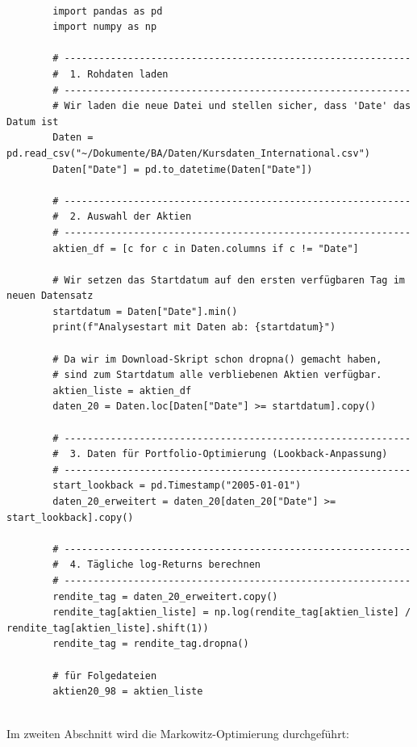 \documentclass[parskip=half]{scrartcl}
\begin{document}
	\begin{lstlisting}[caption={Daten-Vorbereitung}, label={lst:daten_code}]
		
		import pandas as pd
		import numpy as np
		
		# ------------------------------------------------------------
		#  1. Rohdaten laden
		# ------------------------------------------------------------
		# Wir laden die neue Datei und stellen sicher, dass 'Date' das Datum ist
		Daten = pd.read_csv("~/Dokumente/BA/Daten/Kursdaten_International.csv")
		Daten["Date"] = pd.to_datetime(Daten["Date"])
		
		# ------------------------------------------------------------
		#  2. Auswahl der Aktien
		# ------------------------------------------------------------
		aktien_df = [c for c in Daten.columns if c != "Date"]
		
		# Wir setzen das Startdatum auf den ersten verfügbaren Tag im neuen Datensatz
		startdatum = Daten["Date"].min() 
		print(f"Analysestart mit Daten ab: {startdatum}")
		
		# Da wir im Download-Skript schon dropna() gemacht haben, 
		# sind zum Startdatum alle verbliebenen Aktien verfügbar.
		aktien_liste = aktien_df 
		daten_20 = Daten.loc[Daten["Date"] >= startdatum].copy()
		
		# ------------------------------------------------------------
		#  3. Daten für Portfolio-Optimierung (Lookback-Anpassung)
		# ------------------------------------------------------------
		start_lookback = pd.Timestamp("2005-01-01") 
		daten_20_erweitert = daten_20[daten_20["Date"] >= start_lookback].copy()
		
		# ------------------------------------------------------------
		#  4. Tägliche log-Returns berechnen
		# ------------------------------------------------------------
		rendite_tag = daten_20_erweitert.copy()
		rendite_tag[aktien_liste] = np.log(rendite_tag[aktien_liste] / rendite_tag[aktien_liste].shift(1))
		rendite_tag = rendite_tag.dropna()
		
		# für Folgedateien
		aktien20_98 = aktien_liste
		
	\end{lstlisting}
	
	Im zweiten Abschnitt wird die Markowitz-Optimierung durchgeführt:
	
\end{document}
